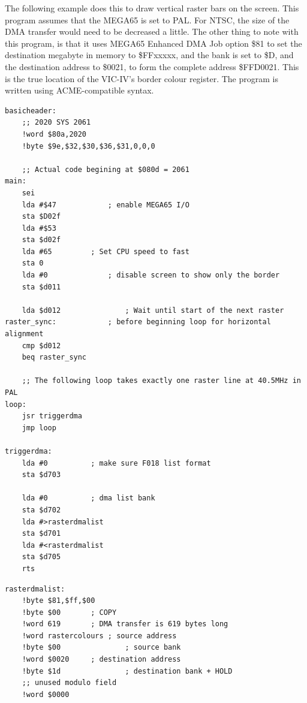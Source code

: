 The following example does this to draw vertical raster bars on the screen.
This program assumes that the MEGA65 is set to PAL.  For NTSC, the size of the DMA transfer
would need to be decreased a little.  The other thing to note with this program, is that
it uses MEGA65 Enhanced DMA Job option \$81 to set the destination megabyte in memory to
\$FFxxxxx, and the bank is set to \$D, and the destination address to \$0021, to form the
complete address \$FFD0021.  This is the true location of the VIC-IV's border colour register.
The program is written using ACME-compatible syntax.

\begin{tcolorbox}[colback=black,coltext=white]
\verbatimfont{\codefont}
\begin{verbatim}
basicheader:
	;; 2020 SYS 2061
	!word $80a,2020
	!byte $9e,$32,$30,$36,$31,0,0,0

	;; Actual code begining at $080d = 2061
main:
	sei
	lda #$47        	; enable MEGA65 I/O
	sta $D02f
	lda #$53
	sta $d02f
	lda #65 		; Set CPU speed to fast
	sta 0
	lda #0            	; disable screen to show only the border
	sta $d011

	lda $d012              	; Wait until start of the next raster
raster_sync:	  		; before beginning loop for horizontal alignment
	cmp $d012
	beq raster_sync

	;; The following loop takes exactly one raster line at 40.5MHz in PAL
loop:
	jsr triggerdma
	jmp loop

triggerdma:
	lda #0			; make sure F018 list format
	sta $d703

	lda #0     		; dma list bank
	sta $d702
	lda #>rasterdmalist
	sta $d701
	lda #<rasterdmalist
	sta $d705
	rts
\end{verbatim}
\end{tcolorbox}

\begin{tcolorbox}[colback=black,coltext=white]
\verbatimfont{\codefont}
\begin{verbatim}
rasterdmalist:
	!byte $81,$ff,$00
	!byte $00 		; COPY
	!word 619 		; DMA transfer is 619 bytes long
	!word rastercolours	; source address
	!byte $00               ; source bank
	!word $0020		; destination address
	!byte $1d               ; destination bank + HOLD
	;; unused modulo field
	!word $0000
\end{verbatim}
\end{tcolorbox}

